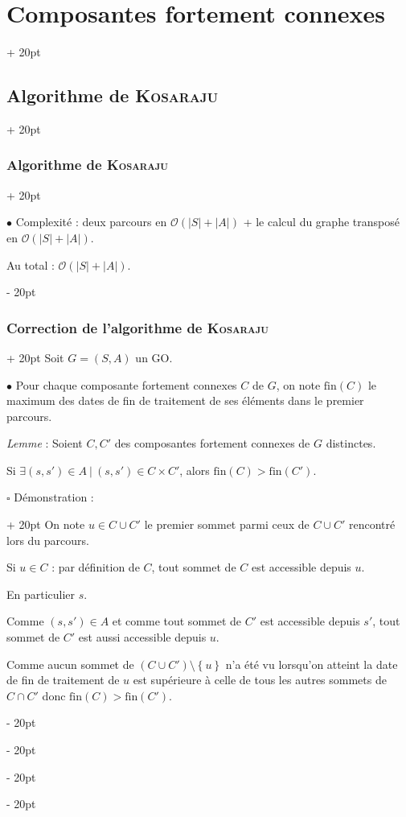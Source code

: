 \documentclass[a4paper, 12pt, twoside]{article}
\newcommand{\set}[1]{\left\{ #1 \right\}}
\newcommand{\abs}[1]{\left\lvert #1 \right\rvert}
\newcommand{\ind}[1][20pt]{\advance\leftskip + #1}
\newcommand{\deind}[1][20pt]{\advance\leftskip - #1}
\newenvironment{indt}[2][20pt]{#2 \par \ind[#1]}{\par \deind} %
\begin{document}
\begin{indt}{\section{Composantes fortement connexes}}
\begin{indt}{\subsection{Algorithme de \textsc{Kosaraju}}}
\begin{indt}{\subsubsection{Algorithme de \textsc{Kosaraju}}}
                \vspace{12pt}
                
                $\bullet$ Complexité :
                deux parcours en $\mathcal O(\abs S + \abs A)$ + le calcul du graphe transposé en $\mathcal O(\abs S + \abs A)$.

                Au total : $\mathcal O(\abs S + \abs A)$.
            \end{indt}

            \begin{indt}{\subsubsection{Correction de l'algorithme de \textsc{Kosaraju}}}
                Soit $G = (S, A)$ un GO.

                $\bullet$ Pour chaque composante fortement connexes $C$ de $G$, on note $\mathrm{fin}(C)$ le maximum des dates de fin de traitement de ses éléments dans le premier parcours.

                \vspace{12pt}
                
                \begin{pseudocode}
                    \textit{Lemme} : Soient $C, C'$ des composantes fortement connexes de $G$ distinctes.

                    Si $\exists (s, s') \in A\ |\ (s, s') \in C \times C'$, alors $\mathrm{fin}(C) > \mathrm{fin}(C')$.
                \end{pseudocode}

                \vspace{12pt}
                
                \begin{indt}{$\square$ Démonstration :}
                    On note $u \in C \cup C'$ le premier sommet parmi ceux de $C \cup C'$ rencontré lors du parcours.

                    Si $u \in C$ : par définition de $C$, tout sommet de $C$ est accessible depuis $u$.

                    En particulier $s$.

                    Comme $(s, s') \in A$ et comme tout sommet de $C'$ est accessible depuis $s'$, tout sommet de $C'$ est aussi accessible depuis $u$.

                    Comme aucun sommet de $(C \cup C') \setminus \set u$ n'a été vu lorsqu'on atteint la date de fin de traitement de $u$ est supérieure à celle de tous les autres sommets de $C \cap C'$ donc $\mathrm{fin}(C) > \mathrm{fin}(C')$.


\end{indt}
\end{indt}
\end{indt}
\end{indt}
\end{document}
